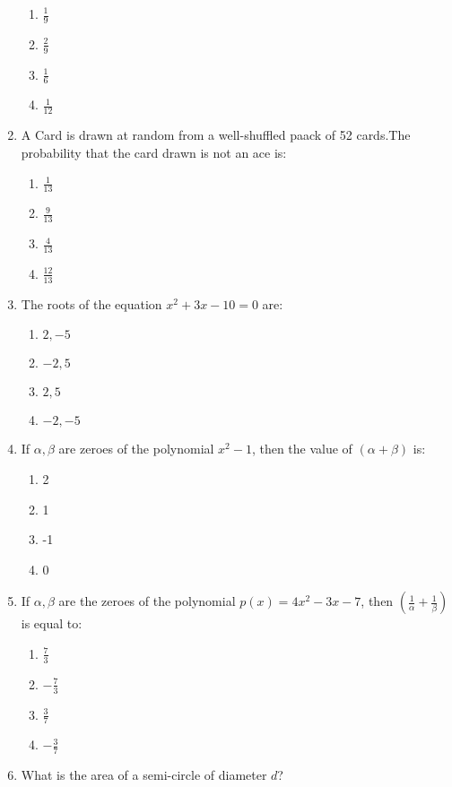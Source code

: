 \documentclass{article}
\begin{document}
\begin{enumerate}
	\begin{enumerate}
	\item  \(\frac{1}{9}\)
	\item \(\frac{2}{9}\)
	\item  \(\frac{1}{6}\)
	\item  \(\frac{1}{12}\)
\end{enumerate}
\item A Card is drawn at random from a well-shuffled paack of 52 cards.The probability that the card drawn is not an ace is:
\begin{enumerate}
	\item \(\frac{1}{13}\)
	\item  \(\frac{9}{13}\)
	\item \(\frac{4}{13}\)
	\item \(\frac{12}{13}\)
\end{enumerate}
\item The roots of the equation \(x^2 + 3x - 10 = 0\) are:

\begin{enumerate}
    \item\(2, -5\)
    \item \(-2, 5\)
    \item \(2, 5\)
    \item \(-2, -5\)
\end{enumerate}

\item If \(\alpha, \beta\) are zeroes of the polynomial \(x^2 - 1\), then the value of \((\alpha + \beta)\) is:

\begin{enumerate}
    \item 2
    \item 1
    \item -1
    \item 0
\end{enumerate}
\item If \( \alpha, \beta \) are the zeroes of the polynomial \( p(x) = 4x^2 - 3x - 7 \), then \( \left(\frac{1}{\alpha} + \frac{1}{\beta}\right) \) is equal to:

\begin{enumerate}
    \item \(\frac{7}{3}\)
    \item\(-\frac{7}{3}\)
    \item \(\frac{3}{7}\)
    \item \(-\frac{3}{7}\)
\end{enumerate}
\item What is the area of a semi-circle of diameter \(d\)?


\end{enumerate}
\end{document}
